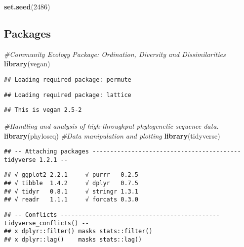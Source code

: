 \documentclass[]{article}
\newenvironment{Shaded}{\begin{snugshade}}{\end{snugshade}}
\newcommand{\KeywordTok}[1]{\textcolor[rgb]{0.13,0.29,0.53}{\textbf{#1}}}
\newcommand{\DecValTok}[1]{\textcolor[rgb]{0.00,0.00,0.81}{#1}}
\newcommand{\CommentTok}[1]{\textcolor[rgb]{0.56,0.35,0.01}{\textit{#1}}}
\newcommand{\NormalTok}[1]{#1}
\begin{document}
\begin{Shaded}
\begin{Highlighting}[]
\KeywordTok{set.seed}\NormalTok{(}\DecValTok{2486}\NormalTok{)}
\end{Highlighting}
\end{Shaded}

\subsection{Packages}\label{packages}

\begin{Shaded}
\begin{Highlighting}[]
\CommentTok{#Community Ecology Package: Ordination, Diversity and Dissimilarities}
\KeywordTok{library}\NormalTok{(vegan)}
\end{Highlighting}
\end{Shaded}

\begin{verbatim}
## Loading required package: permute
\end{verbatim}

\begin{verbatim}
## Loading required package: lattice
\end{verbatim}

\begin{verbatim}
## This is vegan 2.5-2
\end{verbatim}

\begin{Shaded}
\begin{Highlighting}[]
\CommentTok{#Handling and analysis of high-throughput phylogenetic sequence data.}
\KeywordTok{library}\NormalTok{(phyloseq)}
\CommentTok{#Data manipulation and plotting}
\KeywordTok{library}\NormalTok{(tidyverse)}
\end{Highlighting}
\end{Shaded}

\begin{verbatim}
## -- Attaching packages ------------------------------------------ tidyverse 1.2.1 --
\end{verbatim}

\begin{verbatim}
## √ ggplot2 2.2.1     √ purrr   0.2.5
## √ tibble  1.4.2     √ dplyr   0.7.5
## √ tidyr   0.8.1     √ stringr 1.3.1
## √ readr   1.1.1     √ forcats 0.3.0
\end{verbatim}

\begin{verbatim}
## -- Conflicts --------------------------------------------- tidyverse_conflicts() --
## x dplyr::filter() masks stats::filter()
## x dplyr::lag()    masks stats::lag()
\end{verbatim}
\end{document}
